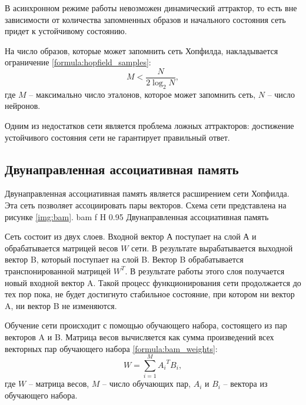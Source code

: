 В асинхронном режиме работы невозможен динамический аттрактор, то есть вне зависимости от количества запомненных образов и начального состояния сеть придет к устойчивому состоянию.

На число образов, которые может запомнить сеть Хопфилда, накладывается ограничение \ref{formula:hopfield_samples}:
\begin{equation}\label{formula:hopfield_samples}
	M < \frac{N}{2\log_2N},
\end{equation}
где $M$ -- максимально число эталонов, которое может запомнить сеть, $N$ -- число нейронов.

Одним из недостатков сети является проблема ложных аттракторов: достижение устойчивого состояния сети не гарантирует правильный ответ.

\subsection{Двунаправленная ассоциативная память}
Двунаправленная ассоциативная память является расширением сети Хопфилда.
Эта сеть позволяет ассоциировать пары векторов.
Схема сети представлена на рисунке \ref{img:bam}.
{bam} %
{f} %
{H} %
{0.95\textwidth} %
{Двунаправленная ассоциативная память} %

Сеть состоит из двух слоев.
Входной вектор А поступает на слой А и обрабатывается матрицей весов $W$ сети.
В результате вырабатывается выходной вектор B, который поступает на слой B.
Вектор B обрабатывается транспонированной матрицей $W^T$.
В результате работы этого слоя получается новый входной вектор A.
Такой процесс функционирования сети продолжается до тех пор пока, не будет достигнуто стабильное состояние, при котором ни вектор A, ни вектор B не изменяются.

Обучение сети происходит с помощью обучающего набора, состоящего из пар векторов A и B.
Матрица весов вычисляется как сумма произведений всех векторных пар обучающего набора \ref{formula:bam_weights}:
\begin{equation}\label{formula:bam_weights}
	W = \sum\limits_{i=1}^{M}{A_i}^T B_i,
\end{equation}
где $W$ -- матрица весов, $M$ -- число обучающих пар, $A_i$ и $B_i$ -- вектора из обучающего набора.

